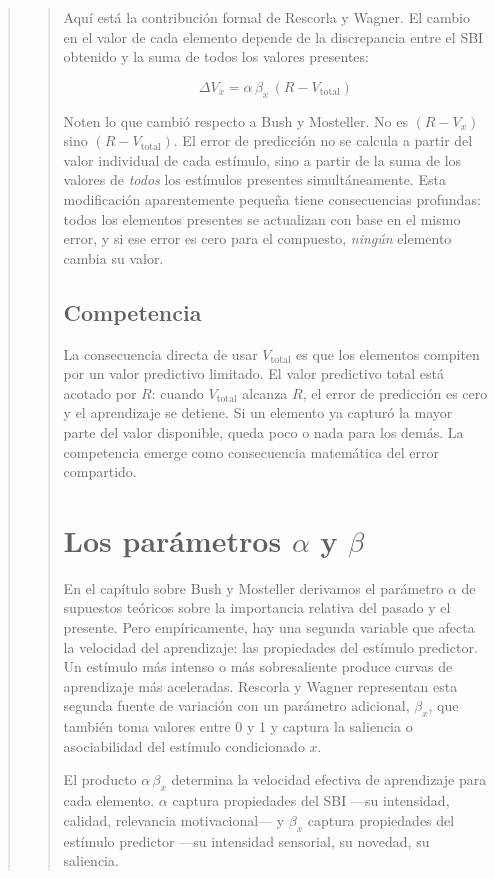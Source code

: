 \documentclass[
  letterpaper,
  DIV=11,
  numbers=noendperiod]{scrreprt}
\begin{document}
\begin{tcolorbox}[enhanced jigsaw, toprule=.15mm, arc=.35mm, colback=white, opacityback=0, colframe=quarto-callout-note-color-frame, breakable, rightrule=.15mm, left=2mm, leftrule=.75mm, bottomrule=.15mm]
\begin{quote}
\begin{quote}
Aquí está la contribución formal de Rescorla y Wagner. El cambio en el
valor de cada elemento depende de la discrepancia entre el SBI obtenido
y la suma de todos los valores presentes:

\[\Delta V_x = \alpha\,\beta_x\,(R - V_{\text{total}})\]

Noten lo que cambió respecto a Bush y Mosteller. No es \((R - V_x)\)
sino \((R - V_{\text{total}})\). El error de predicción no se calcula a
partir del valor individual de cada estímulo, sino a partir de la suma
de los valores de \emph{todos} los estímulos presentes simultáneamente.
Esta modificación aparentemente pequeña tiene consecuencias profundas:
todos los elementos presentes se actualizan con base en el mismo error,
y si ese error es cero para el compuesto, \emph{ningún} elemento cambia
su valor.

\subsection{Competencia}\label{competencia}

La consecuencia directa de usar \(V_{\text{total}}\) es que los
elementos compiten por un valor predictivo limitado. El valor predictivo
total está acotado por \(R\): cuando \(V_{\text{total}}\) alcanza \(R\),
el error de predicción es cero y el aprendizaje se detiene. Si un
elemento ya capturó la mayor parte del valor disponible, queda poco o
nada para los demás. La competencia emerge como consecuencia matemática
del error compartido.

\section{\texorpdfstring{Los parámetros \(\alpha\) y
\(\beta\)}{Los parámetros \textbackslash alpha y \textbackslash beta}}\label{los-paruxe1metros-alpha-y-beta}

En el capítulo sobre Bush y Mosteller derivamos el parámetro \(\alpha\)
de supuestos teóricos sobre la importancia relativa del pasado y el
presente. Pero empíricamente, hay una segunda variable que afecta la
velocidad del aprendizaje: las propiedades del estímulo predictor. Un
estímulo más intenso o más sobresaliente produce curvas de aprendizaje
más aceleradas. Rescorla y Wagner representan esta segunda fuente de
variación con un parámetro adicional, \(\beta_x\), que también toma
valores entre 0 y 1 y captura la saliencia o asociabilidad del estímulo
condicionado \(x\).

El producto \(\alpha\,\beta_x\) determina la velocidad efectiva de
aprendizaje para cada elemento. \(\alpha\) captura propiedades del SBI
---su intensidad, calidad, relevancia motivacional--- y \(\beta_x\)
captura propiedades del estímulo predictor ---su intensidad sensorial,
su novedad, su saliencia.


\end{quote}
\end{quote}
\end{tcolorbox}
\end{document}
